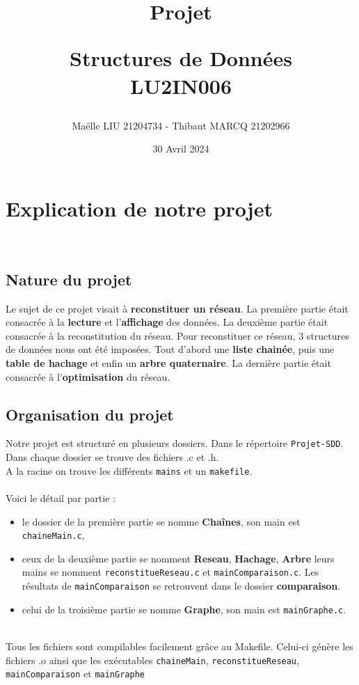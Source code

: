 \documentclass[12pt]{extarticle}
\title{\textbf{Projet} 

Structures de Données\\
LU2IN006 }
\author{Maëlle LIU 21204734 - Thibaut MARCQ 21202966}
\date{30 Avril 2024}
\begin{document}
\maketitle
\renewcommand*\contentsname{Sommaire}
\tableofcontents

\newpage
\section*{Explication de notre projet}
\\ 
\subsection*{Nature du projet}

Le sujet de ce projet visait à \textbf{reconstituer un réseau}. La première partie était consacrée à la \textbf{lecture}  et l'\textbf{affichage} des données. La deuxième partie était consacrée à la reconstitution du réseau. Pour reconstituer ce réseau, 3 structures de données nous ont été imposées. Tout d'abord  une \textbf{liste chainée}, puis une \textbf{table de hachage} et enfin un \textbf{arbre quaternaire}. La dernière partie était consacrée à l'\textbf{optimisation} du réseau.
\\
\subsection*{Organisation du projet}
Notre projet est structuré en plusieurs dossiers. Dans le répertoire \texttt{Projet-SDD}. Dans chaque dossier se trouve des fichiers .c et .h. \\
A la racine on trouve les différents \texttt{mains} et un \texttt{makefile}. \\ \\
Voici le détail par partie :
\begin{itemize}[label=-]
    \item le dossier de la première partie se nomme \textbf{Chaînes}, son main est \texttt{chaineMain.c},
    \item ceux de la deuxième partie se nomment \textbf{Reseau}, \textbf{Hachage}, \textbf{Arbre} leurs mains se nomment \texttt{reconstitueReseau.c} et \texttt{mainComparaison.c}. Les résultats de \texttt{mainComparaison} se retrouvent dans le dossier \textbf{comparaison}.
    \item celui de la troisième partie se nomme \textbf{Graphe}, son main est \texttt{mainGraphe.c}.
\end{itemize}
\\
Tous les fichiers sont compilables facilement grâce au Makefile. Celui-ci génère les fichiers .o ainsi que les exécutables \texttt{chaineMain}, \texttt{reconstitueReseau}, \texttt{mainComparaison} et \texttt{mainGraphe} 
\end{document}
